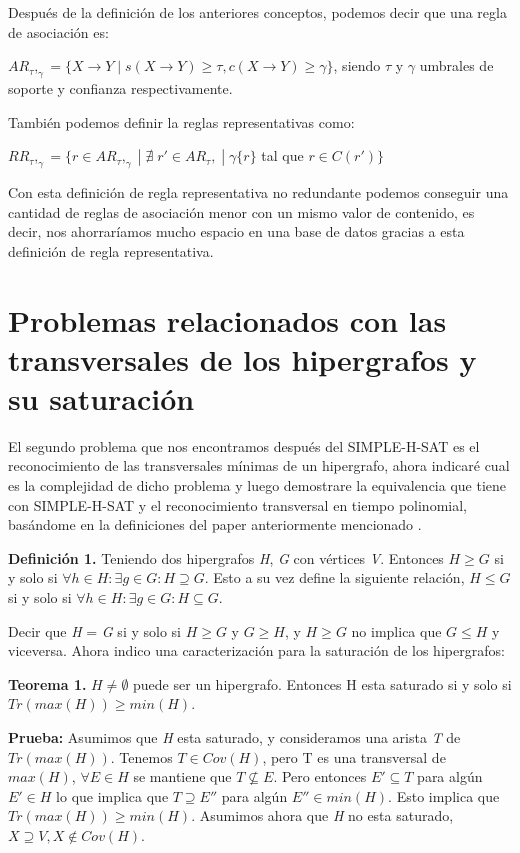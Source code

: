 \documentclass{cosas/tfg_domingo}
\begin{document}
Después de la definición de los anteriores conceptos, podemos decir  que una regla de asociación es:

$AR_\tau,_\gamma=\{X\rightarrow Y \;|\; s(X \rightarrow Y)\geq \tau,c(X \rightarrow Y) \geq \gamma\}$, siendo $\tau$ y $\gamma$ umbrales de soporte y confianza respectivamente.

También podemos definir la reglas representativas como:

$RR_\tau,_\gamma=\{r \in AR_\tau,_\gamma \;|\; \nexists \; r′ \in AR_\tau, \;|\; \gamma\{r\}$ tal que $r \in C(r′)\}$ \citep{UC}

Con esta definición de regla representativa no redundante podemos conseguir una cantidad de reglas de asociación menor con un mismo valor de contenido, es decir, nos ahorraríamos mucho espacio en una base de datos gracias a esta definición de regla representativa.

\newpage

\section{Problemas relacionados con las transversales de los hipergrafos y su saturación}

El segundo problema que nos encontramos después del SIMPLE-H-SAT es el reconocimiento de las transversales mínimas de un hipergrafo, ahora indicaré cual es la complejidad de dicho problema y luego demostrare la equivalencia que tiene con SIMPLE-H-SAT y el reconocimiento transversal en tiempo polinomial, basándome en la definiciones del paper anteriormente mencionado \citep{Thomas}.


\textbf{Definición 1.} Teniendo dos hipergrafos \textit{H}, \textit{G} con vértices \textit{V}. Entonces $H \geq G$ si y solo si $\forall h \in H : \exists g \in G : H \supseteq G$. Esto a su vez define la siguiente relación,  $H \leq G$ si y solo si $\forall h \in H : \exists g \in G : H \subseteq G$.

Decir que  \textit{H} = \textit{G} si y solo si $H \geq G$ y $G \geq H$, y $H \geq G$ no implica que $G \leq H$ y viceversa. Ahora indico una caracterización para la saturación de los hipergrafos:

\textbf{Teorema 1.} $H \neq \emptyset$ puede ser un hipergrafo. Entonces H esta saturado si y solo si $Tr(max(H)) \geq min(H)$.

\textbf{Prueba:} Asumimos que \textit{H} esta saturado, y consideramos una arista \textit{T} de $Tr(max(H))$. Tenemos $T \in Cov(H)$, pero T es una transversal de $max(H)$, $\forall E \in H $ se mantiene que $T \nsubseteq E$. Pero entonces $E' \subseteq T$ para algún $E' \in H$ lo que implica que $T \supseteq E''$ para algún $E'' \in min(H)$. Esto implica que $Tr(max(H)) \geq min(H)$. Asumimos ahora que \textit{H} no esta saturado, $X \supseteq V, X \notin Cov(H)$.
\end{document}
